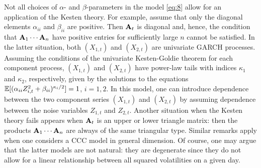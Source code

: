\par
Not all choices of $\alpha$- and $\beta$-parameters in the model \eqref{eq:8} allow for an
application of the Kesten theory. For example, assume that only the
diagonal elements $\alpha_{ii}$ and $\beta_{ii}$ are positive.
Then ${\bf A}_t$ is diagonal and, hence, the condition that
${\bf A}_1\cdots{\bf A}_n$ have positive entries for sufficiently large $n$ 
cannot be satisfied. In the latter situation, both $(X_{1,t})$ and
$(X_{2,t})$ are univariate GARCH processes. Assuming the 
conditions of the univariate Kesten-Goldie theorem for each component
process, $(X_{1,t})$ and $(X_{2,t})$ have power-law tails 
with indices $\kappa_1$ and $\kappa_2$, respectively,  given by the solutions to the equations 
$\mathbb{E} [(\alpha_{ii} Z_{i,t}^2+\beta_{ii})^{\kappa_i/2}]=1$, $i=1,2$. In
this model, one can introduce dependence between the two component
series $(X_{1,t})$ and $(X_{2,t})$ by assuming dependence between the
noise variables $Z_{1,t}$ and $Z_{2,t}$. Another situation when the
Kesten theory fails 
appears when ${\bf A}_t$ is an upper or lower triangle matrix: then the
products  ${\bf A}_1\cdots{\bf A}_n$ are always of the same triangular
type. 
Similar remarks apply when one considers a CCC model in general
dimension. Of course, one may argue that the latter models 
are not natural: they are degenerate since they do not allow 
for a linear relationship
between all squared volatilities on a given day. 

